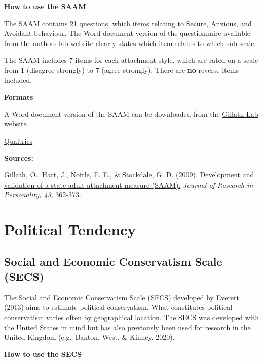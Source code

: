\documentclass[
]{book}
\begin{document}
\textbf{How to use the SAAM}

The SAAM contains 21 questions, which items relating to Secure, Anxious, and Avoidant behaviour. The Word document version of the questionnaire available from the \href{http://gillab.ku.edu/resources}{authors lab website} clearly states which item relates to which sub-scale.

The SAAM includes 7 items for each attachment style, which are rated on a scale from 1 (disagree strongly) to 7 (agree strongly). There are \textbf{no} reverse items included.

\textbf{Formats}

A Word document version of the SAAM can be downloaded from the \href{http://gillab.ku.edu/resources}{Gillath Lab website}

\href{questionnaires/State_Adult_Attachment_Measure_SAAM.qsf}{Qualtrics}

\textbf{Sources:}

Gillath, O., Hart, J., Noftle, E. E., \& Stockdale, G. D. (2009). \href{https://www.researchgate.net/profile/Omri_Gillath/publication/223185973_Development_and_validation_of_a_State_Adult_Attachment_Measure_SAAM/links/5a10d5c2458515cc5aa8073c/Development-and-validation-of-a-State-Adult-Attachment-Measure-SAAM.pdf}{Development and validation of a state adult attachment measure (SAAM).} \emph{Journal of Research in Personality, 43}, 362-373.

\hypertarget{political-tendency}{%
\section{Political Tendency}\label{political-tendency}}

\hypertarget{social-and-economic-conservatism-scale-secs}{%
\subsection{Social and Economic Conservatism Scale (SECS)}\label{social-and-economic-conservatism-scale-secs}}

The Social and Economic Conservatism Scale (SECS) developed by Everett (2013) aims to estimate political conservatism. What constitutes political conservatism varies often by geographical location. The SECS was developed with the United States in mind but has also previously been used for research in the United Kingdom (e.g.~Banton, West, \& Kinney, 2020).

\textbf{How to use the SECS}
\end{document}
